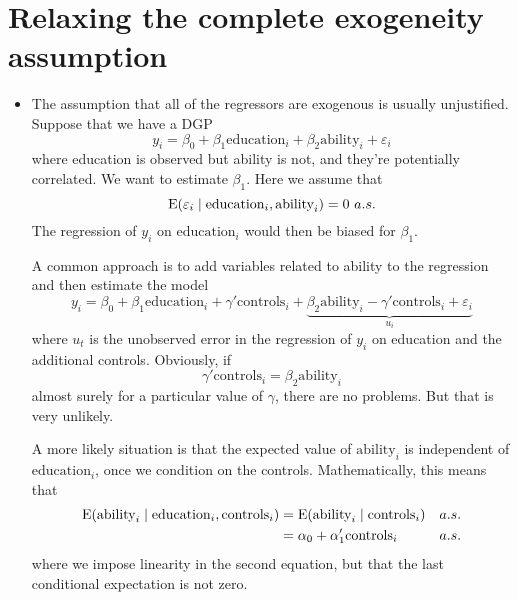 \section{Relaxing the complete exogeneity assumption}

\begin{itemize}[leftmargin=0pt]

\item The assumption that all of the regressors are exogenous is
  usually unjustified. Suppose that we have a DGP
  \begin{equation*}
    y_i = \beta_0 + \beta_1 \text{education}_i
    + \beta_2 \text{ability}_i + \varepsilon_i
  \end{equation*}
  where education is observed but ability is not, and they're
  potentially correlated. We want to estimate $\beta_1$. Here we
  assume that
  \begin{equation*}
    \operatorname{E}(\varepsilon_i \mid \text{education}_i, \text{ability}_i) = 0 \ a.s.
  \end{equation*}
  The regression of $y_i$ on $\text{education}_i$ would then be biased
  for $\beta_1$.

  A common approach is to add variables related to ability to the
  regression and then estimate the model
  \begin{equation*}
    y_i = \beta_0 + \beta_1 \text{education}_i
    + \gamma'\text{controls}_i
    + \underbrace{\beta_2 \text{ability}_i - 
                  \gamma'\text{controls}_i + \varepsilon_i}_{u_i}
  \end{equation*}
  where $u_t$ is the unobserved error in the regression of $y_i$ on
  education and the additional controls. Obviously, if
  \begin{equation*}
    \gamma'\text{controls}_i = \beta_2 \text{ability}_i
  \end{equation*}
  almost surely for a particular value of $\gamma$, there are no
  problems. But that is very unlikely.

  A more likely situation is that the expected value of
  $\text{ability}_i$ is independent of $\text{education}_i$, once we
  condition on the controls. Mathematically, this means that
  \begin{align*}
    \operatorname{E}(\text{ability}_i \mid \text{education}_i, \text{controls}_i)
    &= \operatorname{E}(\text{ability}_i \mid \text{controls}_i) && a.s. \\
    &= \alpha_0 + \alpha_1'\text{controls}_i && a.s.
  \end{align*}
  where we impose linearity in the second equation, but that the last
  conditional expectation is not zero.


\end{itemize}
